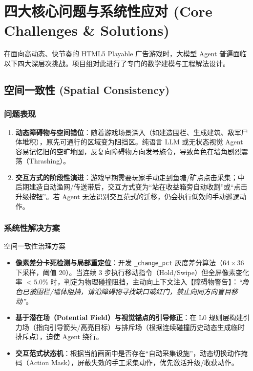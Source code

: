 \documentclass[11pt,a4paper]{ctexart}
\begin{document}
\newpage
\section{四大核心问题与系统性应对 (Core Challenges \& Solutions)}

在面向高动态、快节奏的 HTML5 Playable 广告游戏时，大模型 Agent 普遍面临以下四大深层次挑战。项目组对此进行了专门的数学建模与工程解法设计。

\subsection{空间一致性 (Spatial Consistency)}

\subsubsection{问题表现}
\begin{enumerate}
  \item \textbf{动态障碍物与空间错位}：随着游戏场景深入（如建造围栏、生成建筑、敌军尸体堆积），原先可通行的区域变为阻挡区。纯语言 LLM 或无状态视觉 Agent 容易记忆旧的空旷地图，反复向障碍物方向发号施令，导致角色在墙角剧烈震荡（Thrashing）。
  \item \textbf{交互方式的阶段性演进}：游戏早期需要玩家手动走到鱼塘/矿点点击采集；中后期建造自动渔网/传送带后，交互方式变为“站在收益箱旁自动收割”或“点击升级按钮”。若 Agent 无法识别交互范式的迁移，仍会执行低效的手动巡逻动作。
\end{enumerate}

\subsubsection{系统性解决方案}
\begin{conceptbox}{空间一致性治理方案}
\begin{itemize}
  \item \textbf{像素差分卡死检测与局部重定位}：开发 \texttt{\_change\_pct} 灰度差分算法（$64\times 36$ 下采样，阈值 20）。当连续 3 步执行移动指令（Hold/Swipe）但全屏像素变化率 $<5.0\%$ 时，判定为物理碰撞阻挡，主动向上下文注入【障碍物警告】：\textit{“角色已被围栏/墙体阻挡，请沿障碍物寻找缺口或红门，禁止向同方向盲目移动”}。
  \item \textbf{基于潜在场（Potential Field）与视觉锚点的引导修正}：在 L0 规则层构建引力场（指向引导箭头/高亮目标）与排斥场（根据连续碰撞历史动态生成临时排斥点），迫使 Agent 绕行。
  \item \textbf{交互范式状态机}：根据当前画面中是否存在“自动采集设施”，动态切换动作掩码（Action Mask），屏蔽失效的手工采集动作，优先激活升级/收获动作。
\end{itemize}
\end{conceptbox}
\end{document}
